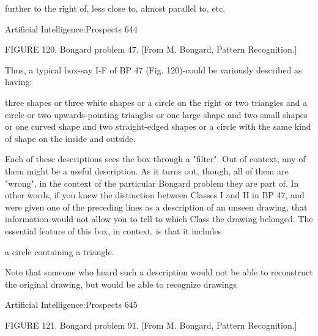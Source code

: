        further to the right of, less close to, almost parallel to, etc.




Artificial Intelligence:Prospects                                                          644

       FIGURE 120. Bongard problem 47. [From M. Bongard, Pattern Recognition.]

Thus, a typical box-say I-F of BP 47 (Fig. 120)-could be variously described as having:

                                             three shapes
                                                  or
                                         three white shapes
                                                  or
                                        a circle on the right
                                                  or
                                      two triangles and a circle
                                                  or
                                  two upwards-pointing triangles
                                                  or
                               one large shape and two small shapes
                                                  or
                          one curved shape and two straight-edged shapes
                                                  or
                  a circle with the same kind of shape on the inside and outside.

Each of these descriptions sees the box through a "filter". Out of context, any of them
might be a useful description. As it turns out, though, all of them are "wrong", in the
context of the particular Bongard problem they are part of. In other words, if you knew
the distinction between Classes I and II in BP 47, and were given one of the preceding
lines as a description of an unseen drawing, that information would not allow you to tell
to which Class the drawing belonged. The essential feature of this box, in context, is that
it includes

                               a circle containing a triangle.

Note that someone who heard such a description would not be able to reconstruct the
original drawing, but would be able to recognize drawings




Artificial Intelligence:Prospects                                                      645

FIGURE 121. Bongard problem 91. [From M. Bongard, Pattern Recognition.]

